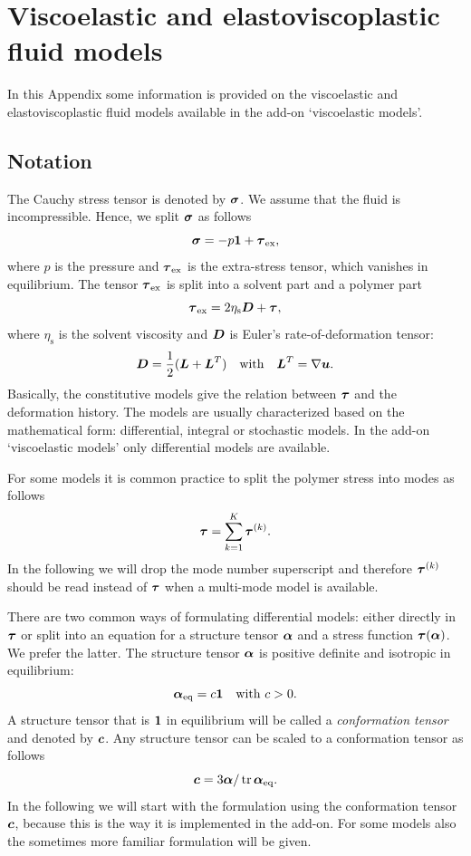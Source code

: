 
\chapter{Viscoelastic and elastoviscoplastic fluid models}
\label{chap:viscoelasticmodels}

\def\chaptertitle{Viscoelastic fluid models}
\def\headdate{6th August 2025} 

In this Appendix some information is provided on the viscoelastic and elastoviscoplastic fluid
models available in the add-on `viscoelastic models'.

\section{Notation}

The Cauchy stress tensor is denoted by $\boldsymbol{\sigma}$. We assume that
the fluid is incompressible.  Hence, we split $\boldsymbol{\sigma}$
as follows
\[
   \boldsymbol{\sigma} = -p\boldsymbol{1} +\boldsymbol{\tau}_\text{ex},
\]
where $p$ is the pressure and $\boldsymbol{\tau}_\text{ex}$ is the extra-stress tensor,
which vanishes in equilibrium.
The tensor $\boldsymbol{\tau}_\text{ex}$ is split into a solvent part and a polymer part
\[
   \boldsymbol{\tau}_\text{ex} = 2\eta_\text{s}\boldsymbol{D} + \boldsymbol{\tau}, 
\]
where $\eta_\text{s}$ is the solvent viscosity and $\boldsymbol{D}$ is Euler's
rate-of-deformation tensor: 
\[
         \boldsymbol{D}=\frac12(\boldsymbol{L} + \boldsymbol{L}^T)\quad\text{with}\quad 
         \boldsymbol{L}^T= \nabla\boldsymbol{u}.
\]
Basically, the constitutive models give the
relation between $\boldsymbol{\tau}$ and the deformation history. 
The models are usually characterized
based on the mathematical form: differential, integral or
stochastic models. 
In the add-on `viscoelastic models' only differential models are available.

For some models it is common practice to split the polymer stress into
modes as follows
\begin{equation}
     \boldsymbol{\tau}=\sum_{k=1}^K \boldsymbol{\tau}^{(k)}.
\end{equation}
In the following we will drop the mode number superscript and
therefore $\boldsymbol{\tau}^{(k)}$ should be read instead of
$\boldsymbol{\tau}$ when a multi-mode model is available.

There are two common ways of formulating differential models:
either directly in $\boldsymbol{\tau}$
or split into an equation for a structure tensor $\boldsymbol{\alpha}$
and a stress function $\boldsymbol{\tau}(\boldsymbol{\alpha})$. We prefer the latter.
The structure tensor
$\boldsymbol{\alpha}$ is positive definite and isotropic in equilibrium:
\[
   \boldsymbol{\alpha}_{\rm eq}=c\boldsymbol{1} \quad \text{with $c>0$}.
\]
A structure tensor that is $\boldsymbol{1}$ in equilibrium will be called a
\emph{conformation tensor} and denoted by $\boldsymbol{c}$. Any structure tensor
can be scaled to a conformation tensor as follows
\[
   \boldsymbol{c}=3\boldsymbol{\alpha}/\operatorname{tr}\boldsymbol{\alpha}_{\text{eq}}.
\]
In the following we will start with
the formulation using the conformation tensor $\boldsymbol{c}$, because this is the way
it is implemented in the add-on. 
For some models also the sometimes more familiar formulation will be given.

